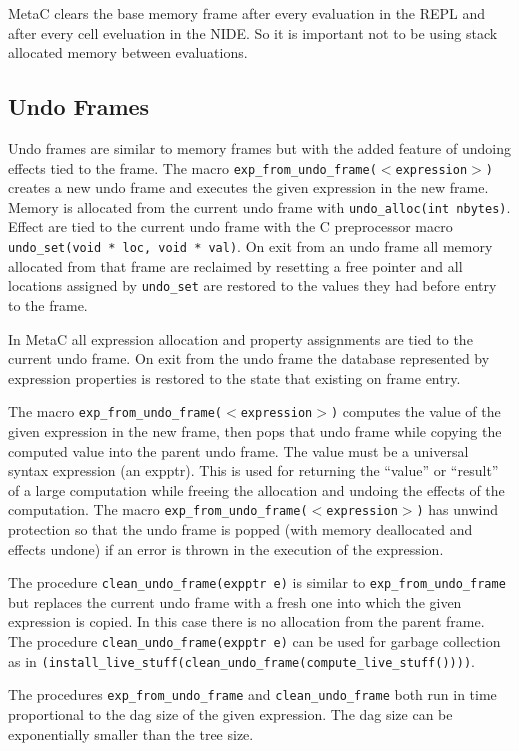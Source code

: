 \documentclass{article}
\begin{document}
MetaC clears the base memory frame after every evaluation in the REPL and after every cell eveluation in the NIDE.  So it is important not to be using
stack allocated memory between evaluations.

\subsection{Undo Frames}
\label{sec:undo}
Undo frames are similar to memory frames but with the added feature of undoing effects tied to the frame.
The macro {\tt exp\_from\_undo\_frame($<$expression$>$)} creates a new undo frame and executes the given expression
in the new frame. Memory is allocated from the current undo frame
with {\tt undo\_alloc(int nbytes)}.  Effect are tied to the current undo frame with the C preprocessor macro
{\tt undo\_set(void * loc, void * val)}.  On exit from an undo frame all memory allocated from that frame are reclaimed by resetting a free pointer
and all locations assigned by {\tt undo\_set} are restored to the values they had before entry to the frame.

In MetaC all expression allocation and property assignments are tied to the current undo frame.
On exit from the undo frame the database represented by expression properties is restored to
the state that existing on frame entry.

The macro {\tt exp\_from\_undo\_frame($<$expression$>$)} computes the value of the given expression in the new frame, then pops that undo frame while
copying the computed value into the parent undo frame.  The value must be a universal syntax expression
(an expptr). This is used for returning the ``value'' or ``result'' of a large computation while freeing the allocation and undoing the effects of the computation.
The macro {\tt exp\_from\_undo\_frame($<$expression$>$)} has unwind protection so that the undo frame is popped (with memory deallocated and effects undone)
if an error is thrown in the execution of the expression.

The procedure {\tt clean\_undo\_frame(expptr e)} is similar to {\tt exp\_from\_undo\_frame} but replaces the current undo frame with a fresh one
into which the given expression is copied.  In this case there is no allocation from the parent frame.
The procedure {\tt clean\_undo\_frame(expptr e)} can be used for garbage collection
as in {\tt (install\_live\_stuff(clean\_undo\_frame(compute\_live\_stuff())))}.

The procedures {\tt exp\_from\_undo\_frame} and {\tt clean\_undo\_frame} both run in time proportional to the dag size of the
given expression. The dag size can be exponentially smaller than the tree size.
\end{document}
